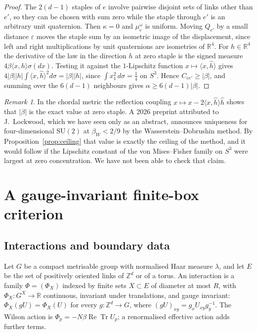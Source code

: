\documentclass[11pt]{amsart}
\theoremstyle{definition}
\theoremstyle{remark}
\newtheorem{remark}[theorem]{Remark}
\newcommand{\R}{\mathbb{R}}
\newcommand{\Z}{\mathbb{Z}}
\newcommand{\SU}{\mathrm{SU}}
\newcommand{\ReTr}{\operatorname{Re}\operatorname{Tr}}
\newcommand{\ip}[2]{\langle #1,#2\rangle}
\begin{document}
\begin{proof}
The $2(d-1)$ staples of $e$ involve pairwise disjoint sets of links other than
$e'$, so they can be chosen with sum zero while the staple through $e'$ is an
arbitrary unit quaternion. Then $\kappa=0$ and $\mu_e^\omega$ is uniform.
Moving $Q_{e'}$ by a small distance $\varepsilon$ moves the staple sum by an
isometric image of the displacement, since left and right multiplications by
unit quaternions are isometries of $\R^4$. For $h\in\R^4$ the derivative of the
law in the direction $h$ at zero staple is the signed measure
$4\beta\ip xh\sigma(dx)$. Testing it against the $1$-Lipschitz function
$x\mapsto\ip x{\hat h}$ gives
$4|\beta||h|\int\ip x{\hat h}^2d\sigma=|\beta||h|$, since
$\int x_1^2\,d\sigma=\frac14$ on $S^3$. Hence $C_{ee'}\ge|\beta|$, and summing
over the $6(d-1)$ neighbours gives $\alpha\ge6(d-1)|\beta|$.
\end{proof}

\begin{remark}
In the chordal metric the reflection coupling
$x\mapsto x-2\ip x{\hat h}\hat h$ shows that $|\beta|$ is the exact value at
zero staple. A 2026 preprint attributed to J.~Lockwood, which we have seen only
as an abstract, announces uniqueness for four-dimensional $\SU(2)$ at
$\beta_W<2/9$ by the Wasserstein--Dobrushin method. By
Proposition~\ref{prop:ceiling} that value is exactly the ceiling of the method,
and it would follow if the Lipschitz constant of the von Mises--Fisher family
on $S^3$ were largest at zero concentration. We have not been able to check that
claim.
\end{remark}

\section{A gauge-invariant finite-box criterion}\label{sec:box}

\subsection{Interactions and boundary data}

Let $G$ be a compact metrisable group with normalised Haar measure $\lambda$,
and let $E$ be the set of positively oriented links of $\Z^d$ or of a torus.
An interaction is a family $\Phi=(\Phi_X)$ indexed by finite sets $X\subset E$
of diameter at most $R$, with $\Phi_X\colon G^X\to\R$ continuous, invariant
under translations, and gauge invariant: $\Phi_X(gU)=\Phi_X(U)$ for every
$g\colon\Z^d\to G$, where $(gU)_{xy}=g_xU_{xy}g_y^{-1}$. The Wilson action is
$\Phi_p=-N\beta\ReTr U_p$; a renormalised effective action adds further terms.
\end{document}
